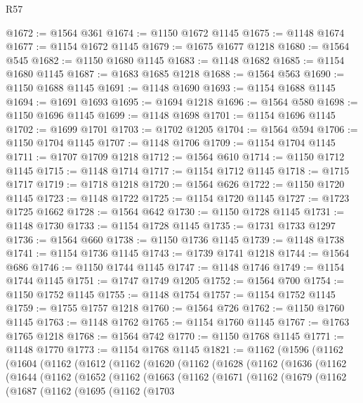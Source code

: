 \begin{lexlean}{R57}
\begin{coremodule}
@1672 := @1564 @361
@1674 := @1150 @1672 @1145
@1675 := @1148 @1674
@1677 := @1154 @1672 @1145
@1679 := @1675 @1677 @1218
@1680 := @1564 @545
@1682 := @1150 @1680 @1145
@1683 := @1148 @1682
@1685 := @1154 @1680 @1145
@1687 := @1683 @1685 @1218
@1688 := @1564 @563
@1690 := @1150 @1688 @1145
@1691 := @1148 @1690
@1693 := @1154 @1688 @1145
@1694 := @1691 @1693
@1695 := @1694 @1218
@1696 := @1564 @580
@1698 := @1150 @1696 @1145
@1699 := @1148 @1698
@1701 := @1154 @1696 @1145
@1702 := @1699 @1701
@1703 := @1702 @1205
@1704 := @1564 @594
@1706 := @1150 @1704 @1145
@1707 := @1148 @1706
@1709 := @1154 @1704 @1145
@1711 := @1707 @1709 @1218
@1712 := @1564 @610
@1714 := @1150 @1712 @1145
@1715 := @1148 @1714
@1717 := @1154 @1712 @1145
@1718 := @1715 @1717
@1719 := @1718 @1218
@1720 := @1564 @626
@1722 := @1150 @1720 @1145
@1723 := @1148 @1722
@1725 := @1154 @1720 @1145
@1727 := @1723 @1725 @1662
@1728 := @1564 @642
@1730 := @1150 @1728 @1145
@1731 := @1148 @1730
@1733 := @1154 @1728 @1145
@1735 := @1731 @1733 @1297
@1736 := @1564 @660
@1738 := @1150 @1736 @1145
@1739 := @1148 @1738
@1741 := @1154 @1736 @1145
@1743 := @1739 @1741 @1218
@1744 := @1564 @686
@1746 := @1150 @1744 @1145
@1747 := @1148 @1746
@1749 := @1154 @1744 @1145
@1751 := @1747 @1749 @1205
@1752 := @1564 @700
@1754 := @1150 @1752 @1145
@1755 := @1148 @1754
@1757 := @1154 @1752 @1145
@1759 := @1755 @1757 @1218
@1760 := @1564 @726
@1762 := @1150 @1760 @1145
@1763 := @1148 @1762
@1765 := @1154 @1760 @1145
@1767 := @1763 @1765 @1218
@1768 := @1564 @742
@1770 := @1150 @1768 @1145
@1771 := @1148 @1770
@1773 := @1154 @1768 @1145
@1821 := @1162
    (@1596
      (@1162
        (@1604
          (@1162
            (@1612
              (@1162
                (@1620
                  (@1162
                    (@1628
                      (@1162
                        (@1636
                          (@1162
                            (@1644
                              (@1162
                                (@1652
                                  (@1162
                                    (@1663
                                      (@1162
                                        (@1671
                                          (@1162
                                            (@1679
                                              (@1162
                                                (@1687
                                                  (@1162
                                                    (@1695
                                                      (@1162
                                                        (@1703

\end{coremodule}
\end{lexlean}
